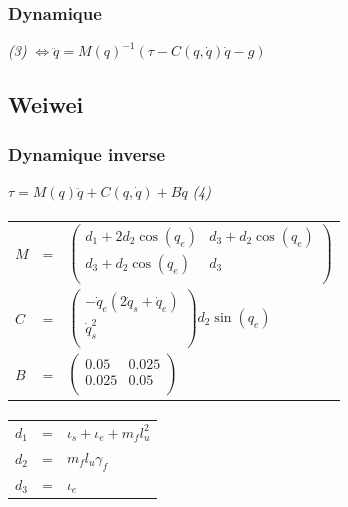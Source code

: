 \documentclass[pdftex,a4paper,11pt]{article}
\begin{document}
\subsubsection{Dynamique}
\emph{(3)} $\Leftrightarrow \ddot{q} = M(q)^{-1} (\tau - C(q, \dot{q}) \dot{q} - g) $


\subsection{Weiwei}

\subsubsection{Dynamique inverse}
$\tau = M(q)\ddot{q} + C(q, \dot{q}) + B\dot{q} $ \emph{(4)}

\paragraph{}
\begin{tabular}{lcl}
    $M$ & = &
    $
    \begin{pmatrix}
        d_1 + 2 d_2 \cos(q_e)  & d_3 + d_2 \cos(q_e) \\
        d_3 + d_2 \cos(q_e) & d_3 \\
    \end{pmatrix}
    $ \\

    $C$ & = &
    $
    \begin{pmatrix}
        -\dot{q}_e (2 \dot{q}_s + \dot{q}_e) \\
        \dot{q}_s^2 \\
    \end{pmatrix}
    d_2 \sin(q_e)
    $\\

    $B$ & = &
    $
    \begin{pmatrix}
        0.05  & 0.025 \\
        0.025 & 0.05 \\
    \end{pmatrix}
    $
\end{tabular}

\paragraph{}
\begin{tabular}{lcl}
    $d_1$ & = & $\iota_s + \iota_e + m_f l_u^2$ \\
    $d_2$ & = & $m_f l_u \gamma_f$ \\
    $d_3$ & = & $\iota_e$ \\
\end{tabular}
\end{document}

